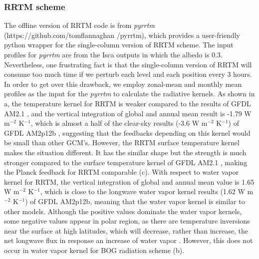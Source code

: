 \subsubsection{RRTM scheme} The offline version of RRTM code is from \textit{pyrrtm} (https://github.com/tomflannaghan /pyrrtm), which provides a user-friendly python wrapper for the single-column version of RRTM scheme. The input profiles for \textit{pyrrtm} are from the Isca outputs in which the albedo is 0.3. Nevertheless, one frustrating fact is that the single-column version of RRTM will consume too much time if we perturb each level and each position every 3 hours. In order to get over this drawback, we employ zonal-mean and monthly mean profiles as the input for the \textit{pyrrtm} to calculate the radiative kernels. As shown in a, the temperature kernel for RRTM is weaker compared to the results of GFDL AM2.1 \citep[see their Fig. A1 of][]{Feldl2017coupled}, and the vertical integration of global and annual mean result is -1.79 W m$^{-2}$ K$^{-1}$, which is almost a half of the clear-sky results (-3.6 W m$^{-2}$ K$^{-1}$) of GFDL AM2p12b \citep{Soden2008}, suggesting that the feedbacks depending on this kernel would be small than other GCM's. However, the RRTM surface temperature kernel makes the situation different. It has the similar shape but the strength is much stronger compared to the surface temperature kernel of GFDL AM2.1 \citep[see their Fig. A1 of][]{Feldl2017coupled}, making the Planck feedback for RRTM comparable (c). With respect to water vapor kernel for RRTM, the vertical integration of global and annual mean value is 1.65 W m$^{-2}$ K$^{-1}$, which is close to the longwave water vapor kernel results (1.62 W m$^{-2}$ K$^{-1}$) of GFDL AM2p12b, meaning that the water vapor kernel is similar to other models. Although the positive values dominate the water vapor kernels, some negative values appear in polar region, as there are temperature inversions near the surface at high latitudes, which will decrease, rather than increase, the net longwave flux in response an increase of water vapor \citep{Soden2008}. However, this does not occur in water vapor kernel for BOG radiation scheme (b).



